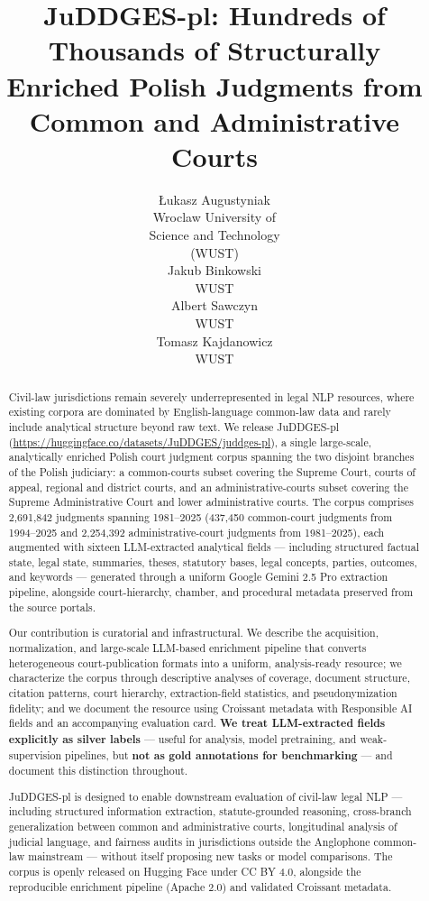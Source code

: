 \documentclass{article}
\title{JuDDGES-pl: Hundreds of Thousands of Structurally Enriched Polish Judgments from Common and Administrative Courts}
\author{%
  {\L}ukasz Augustyniak \\
  Wroclaw University of \\ Science and Technology \\ (WUST) \\
  \And
  Jakub Binkowski \\
  WUST \\
  \And
  Albert Sawczyn \\
  WUST \\
  \And
  Tomasz Kajdanowicz \\
  WUST \\
}
\newcommand{\juddgespl}{JuDDGES-pl}
\begin{document}
\maketitle

\begin{abstract}
Civil-law jurisdictions remain severely underrepresented in legal NLP resources, where existing corpora are dominated by English-language common-law data and rarely include analytical structure beyond raw text. We release \juddgespl{} (\url{https://huggingface.co/datasets/JuDDGES/juddges-pl}), a single large-scale, analytically enriched Polish court judgment corpus spanning the two disjoint branches of the Polish judiciary: a common-courts subset covering the Supreme Court, courts of appeal, regional and district courts, and an administrative-courts subset covering the Supreme Administrative Court and lower administrative courts. The corpus comprises 2{,}691{,}842 judgments spanning 1981--2025 (437{,}450 common-court judgments from 1994--2025 and 2{,}254{,}392 administrative-court judgments from 1981--2025), each augmented with sixteen LLM-extracted analytical fields --- including structured factual state, legal state, summaries, theses, statutory bases, legal concepts, parties, outcomes, and keywords --- generated through a uniform Google Gemini 2.5 Pro extraction pipeline, alongside court-hierarchy, chamber, and procedural metadata preserved from the source portals.

Our contribution is curatorial and infrastructural. We describe the acquisition, normalization, and large-scale LLM-based enrichment pipeline that converts heterogeneous court-publication formats into a uniform, analysis-ready resource; we characterize the corpus through descriptive analyses of coverage, document structure, citation patterns, court hierarchy, extraction-field statistics, and pseudonymization fidelity; and we document the resource using Croissant metadata with Responsible AI fields and an accompanying evaluation card. \textbf{We treat LLM-extracted fields explicitly as silver labels} --- useful for analysis, model pretraining, and weak-supervision pipelines, but \textbf{not as gold annotations for benchmarking} --- and document this distinction throughout.

\juddgespl{} is designed to enable downstream evaluation of civil-law legal NLP --- including structured information extraction, statute-grounded reasoning, cross-branch generalization between common and administrative courts, longitudinal analysis of judicial language, and fairness audits in jurisdictions outside the Anglophone common-law mainstream --- without itself proposing new tasks or model comparisons. The corpus is openly released on Hugging Face under CC BY 4.0, alongside the reproducible enrichment pipeline (Apache 2.0) and validated Croissant metadata.
\end{abstract}
\end{document}
